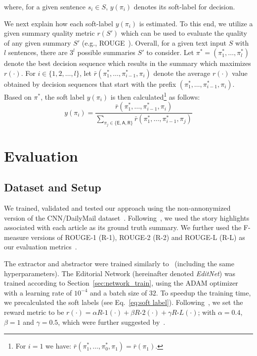 \documentclass{article}
\begin{document}
where, for a given sentence $s_{i}\in{S}$, $y(\pi_i)$ denotes its soft-label for decision.  

We next explain how each soft-label $y(\pi_i)$ is estimated. 
To this end, we utilize a given summary quality metric $r(S')$ which can be used to evaluate the quality of any given summary $S'$ 
(e.g., ROUGE~\cite{lin2004rouge}). Overall, for a given text input $S$ with $l$ sentences, there are $3^{l}$ possible summaries $S'$ to consider. Let $\pi^{*}=(\pi_{1}^{*},\ldots,\pi_{l}^{*})$ denote the best decision sequence which results in the summary which maximizes $r(\cdot)$. For $i\in\{1,2,\ldots,l\}$, let $\bar{r}(\pi_{1}^{*},\ldots,\pi_{i-1}^{*},\pi_{i})$ denote the average $r(\cdot)$ value obtained by decision sequences that start with the prefix $(\pi_{1}^{*},\ldots,\pi_{i-1}^{*},\pi_{i})$. Based on $\pi^{*}$, the soft label $y(\pi_i)$ is then calculated\footnote{\small For $i=1$ we have: $\bar{r}(\pi_{1}^{*},\ldots,\pi_{0}^{*},\pi_{1})=\bar{r}(\pi_{1})$.} as follows:
\begin{equation}\label{eq:soft label}
  y(\pi_i)=\frac{\bar{r}(\pi_{1}^{*},\ldots,\pi_{i-1}^{*},\pi_i)}{\sum_{\pi_j\in\{\textsf{E},\textsf{A},\textsf{R}\}}\bar{r}(\pi_{1}^{*},\ldots,\pi_{i-1}^{*},\pi_j)}
\end{equation}



\section{Evaluation}
\subsection{Dataset and Setup}
We trained, validated and tested our approach using the non-annonymized version of the CNN/DailyMail dataset~\cite{Hermann:2015:TMR:2969239.2969428}. Following~\cite{DBLP:conf/conll/NallapatiZSGX16}, we used the story highlights associated with each article as its ground truth summary. We further used the F-measure versions of ROUGE-1 (R-1), ROUGE-2 (R-2) and ROUGE-L (R-L) as our evaluation metrics~\cite{lin2004rouge}.

The extractor and abstractor were trained similarly to~\cite{ChenFastAS2018} (including the same hyperparameters).
The Editorial Network (hereinafter denoted \textit{EditNet}) was trained according to Section~\ref{sec:network_train}, using the ADAM optimizer with a learning rate of $10^{-4}$ and a batch size of $32$. To speedup the training time, we precalculated the soft labels (see Eq.~\ref{eq:soft label}).
Following~\cite{DBLP:conf/emnlp/DongSCHC18,Wu2018LearningTE}, we set the reward metric to be $r(\cdot) = \alpha R\mbox{-}1(\cdot) + \beta R\mbox{-}2(\cdot) + \gamma  R\mbox{-}L(\cdot)$; with $\alpha=0.4$, $\beta=1$ and $\gamma=0.5$, which were further suggested by~\cite{Wu2018LearningTE}.
\end{document}
